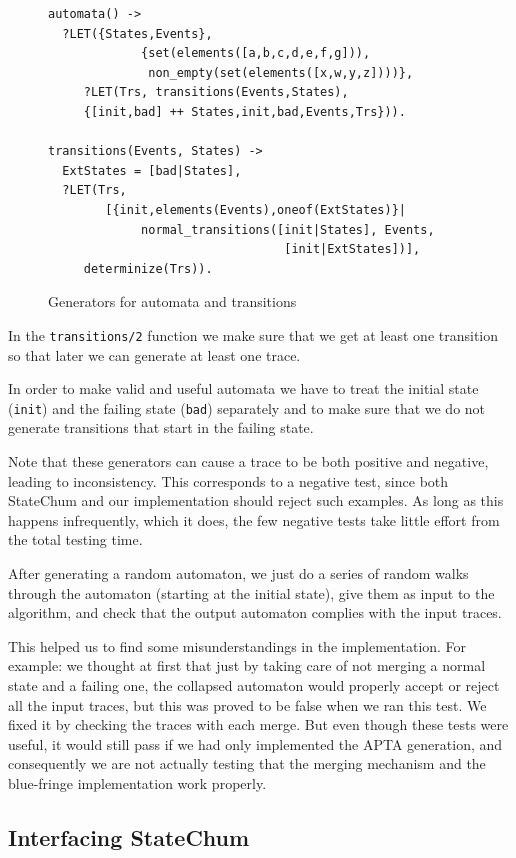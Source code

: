 \documentclass[]{sigplanconf}
\begin{document}
\begin{figure}
\begin{verbatim}
automata() ->
  ?LET({States,Events}, 
             {set(elements([a,b,c,d,e,f,g])),
              non_empty(set(elements([x,w,y,z])))},
     ?LET(Trs, transitions(Events,States),
     {[init,bad] ++ States,init,bad,Events,Trs})).

transitions(Events, States) ->
  ExtStates = [bad|States],
  ?LET(Trs, 
        [{init,elements(Events),oneof(ExtStates)}|
	         normal_transitions([init|States], Events, 
	                             [init|ExtStates])],
	 determinize(Trs)).
\end{verbatim}
\caption{Generators for automata and transitions}
\label{generateAT}
\end{figure}

In the \texttt{transitions/2} function we make sure that we get at least one transition
so that later we can generate at least one trace.

In order to make valid and useful automata we  have to treat the
initial state (\texttt{init}) and the failing state (\texttt{bad})
separately and to make sure that we do not generate transitions
that start in the failing state.

Note that these generators can cause a trace to be both positive and negative, leading to inconsistency. This corresponds to a negative test, since both StateChum and our implementation should reject such examples. As long as this happens infrequently, which it does, the few negative tests take little effort from the total testing time.

After generating a random automaton, we just do a series of
random walks through the automaton (starting at the initial state),
give them as input to the algorithm, and check that the output automaton
complies with the input traces.

This helped us to find some misunderstandings in the implementation. For
example: we thought at first  that just by taking care of not
merging a normal state and a failing one, the collapsed automaton would
properly accept or reject all the input traces, but this was proved to
be false when we ran this test. We fixed it by checking the traces with
each merge. But even though these tests were useful, it would still pass
if we had only implemented the APTA generation, and consequently we are
not actually testing that the merging mechanism and the blue-fringe
implementation work properly.

\subsection{Interfacing StateChum}
\end{document}
